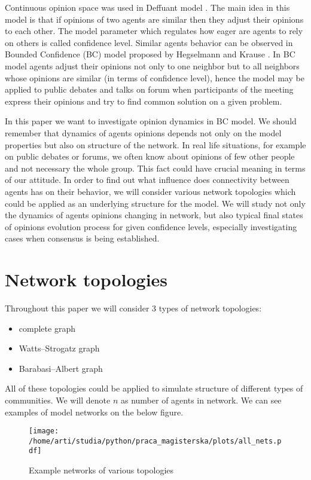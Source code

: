 \documentclass{article}
\begin{document}
Continuous opinion space was used in Deffuant model \cite{dm}. The main idea in this model is that if opinions of two agents are similar then they adjust their opinions to each other. The model parameter which regulates how eager are agents to rely on others is called confidence level. Similar agents behavior can be observed in Bounded Confidence (BC) model proposed by Hegselmann and Krause \cite{bc}. In BC model agents adjust their opinions not only to one neighbor but to all neighbors whose opinions are similar (in terms of confidence level), hence the model may be applied to public debates and talks on forum when participants of the meeting express their opinions and try to find common solution on a given problem.
\indent

In this paper we want to investigate opinion dynamics in BC model. We should remember that dynamics of agents opinions depends not only on the model properties but also on structure of the network. In real life situations, for example on public debates or forums, we often know about opinions of few other people and not necessary the whole group. This fact could have crucial meaning in terms of our attitude. In order to find out what influence does connectivity between agents has on their behavior, we will consider various network topologies which could be applied as an underlying structure for the model. We will study not only the dynamics of agents opinions changing in network, but also typical final states of opinions evolution process for given confidence levels, especially investigating cases when consensus is being established.

\section{Network topologies}
Throughout this paper we will consider 3 types of network topologies:
\begin{itemize}
\item complete graph
\item Watts--Strogatz graph \cite{ws}
\item Barabasi--Albert graph \cite{ba}
\end{itemize}
All of these topologies could be applied to simulate structure of different types of communities. We will denote $n$ as number of agents in network. We can see examples of model networks on the below figure.

\begin{figure}[H]
		\centering
		\texttt{[image: /home/arti/studia/python/praca\_magisterska/plots/all\_nets.pdf]}
		\caption{Example networks of various topologies}
		\label{nets}
\end{figure}
\end{document}
